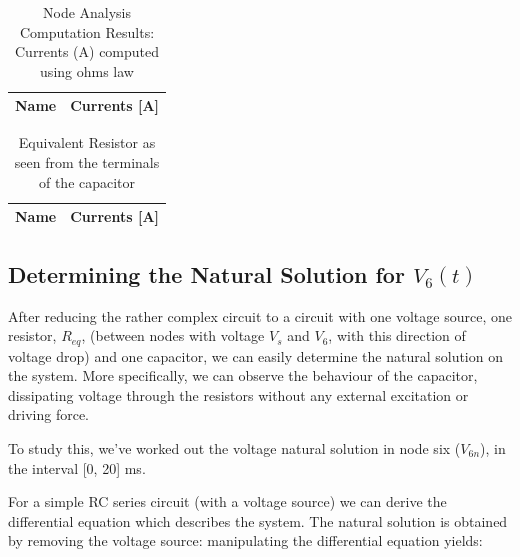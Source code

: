 \begin{table}[h]
  \centering
  \begin{tabular}{|l|r|}
    \hline    
    {\bf Name} & {\bf Currents [A]} \\ \hline
    
  \end{tabular}
  \caption{Node Analysis Computation Results: Currents (A) computed using ohms law}
  \label{tab:nodeCurrents2}
\end{table}

\begin{table}[h]
  \centering
  \begin{tabular}{|l|r|}
    \hline    
    {\bf Name} & {\bf Currents [A]} \\ \hline
    
  \end{tabular}
  \caption{Equivalent Resistor as seen from the terminals of the capacitor}
  \label{tab:Req}
\end{table}



\clearpage
\subsection{Determining the Natural Solution for $V_6(t)$}

After reducing the rather complex circuit to a circuit with one voltage source, one resistor, $R_{eq}$, (between nodes with voltage $V_s$ and $V_6$, with this direction of voltage drop) and one capacitor, we can easily determine the natural solution on the system. More specifically, we can observe the behaviour of the capacitor, dissipating voltage through the resistors without any external excitation or driving force. 

To study this, we've worked out the voltage natural solution in node six ($V_{6n}$), in the interval [0, 20] ms.

For a simple RC series circuit (with a voltage source) we can derive the differential equation which describes the system. The natural solution is obtained by removing the voltage source: manipulating the differential equation yields: 



